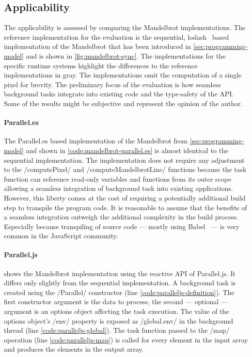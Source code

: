 \subsection{Applicability}
The applicability is assessed by comparing the Mandelbrot implementations. The reference implementation for the evaluation is the sequential, lodash~\cite{lodash} based implementation of the Mandelbrot that has been introduced in \cref{sec:programming-model} and is shown in \cref{fig:mandelbrot-sync}. The implementations for the specific runtime systems highlight the differences to the reference implementations in gray. The implementations omit the computation of a single pixel for brevity. The preliminary focus of the evaluation is how seamless background tasks integrate into existing code and the type-safety of the API. Some of the results might be subjective and represent the opinion of the author. 

\paragraph{Parallel.es}
The Parallel.es based implementation of the Mandelbrot from \cref{sec:programming-model} and shown in  \cref{code:mandelbrot-parallel.es} is almost identical to the sequential implementation. The implementation does not require any adjustment to the \javascriptinline/computePixel/ and \javascriptinline/computeMandelbrotLine/ functions because the task function can reference read-only variables and functions from its outer scope allowing a seamless integration of background task into existing applications. However, this liberty comes at the cost of requiring a potentially additional build step to transpile the program code. It is reasonable to assume that the benefits of a seamless integration outweigh the additional complexity in the build process. Especially because transpiling of source code --- mostly using Babel~\cite{babel} --- is very common in the JavaScript community. 

\paragraph{Parallel.js}
 shows the Mandelbrot implementation using the reactive API of Parallel.js. It differs only slightly from the sequential implementation. A background task is created using the \javascriptinline/Parallel/ constructor (line \ref{code:paralleljs-definition}). The first constructor argument is the data to process, the second --- optional --- argument is an options object affecting the task execution. The value of the options object's \javascriptinline/env/ property is exposed as \javascriptinline/global.env/ in the background thread (line \ref{code:paralleljs-global}). The task function passed to the \javascriptinline/map/ operation (line \ref{code:paralleljs-map}) is called for every element in the input array and produces the elements in the output array.

